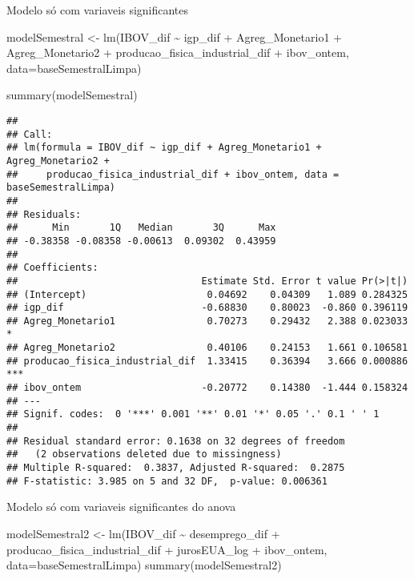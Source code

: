 \documentclass[
]{article}
\newenvironment{Shaded}{\begin{snugshade}}{\end{snugshade}}
\newcommand{\AttributeTok}[1]{\textcolor[rgb]{0.77,0.63,0.00}{#1}}
\newcommand{\FunctionTok}[1]{\textcolor[rgb]{0.00,0.00,0.00}{#1}}
\newcommand{\NormalTok}[1]{#1}
\newcommand{\OtherTok}[1]{\textcolor[rgb]{0.56,0.35,0.01}{#1}}
\newcommand{\SpecialCharTok}[1]{\textcolor[rgb]{0.00,0.00,0.00}{#1}}
\begin{document}
Modelo só com variaveis significantes

\begin{Shaded}
\begin{Highlighting}[]
\NormalTok{modelSemestral }\OtherTok{\textless{}{-}} \FunctionTok{lm}\NormalTok{(IBOV\_dif }\SpecialCharTok{\textasciitilde{}}\NormalTok{ igp\_dif }\SpecialCharTok{+}\NormalTok{ Agreg\_Monetario1 }\SpecialCharTok{+}\NormalTok{ Agreg\_Monetario2 }\SpecialCharTok{+}\NormalTok{ producao\_fisica\_industrial\_dif }\SpecialCharTok{+}\NormalTok{ ibov\_ontem,}
                     \AttributeTok{data=}\NormalTok{baseSemestralLimpa)}

\FunctionTok{summary}\NormalTok{(modelSemestral)}
\end{Highlighting}
\end{Shaded}

\begin{verbatim}
## 
## Call:
## lm(formula = IBOV_dif ~ igp_dif + Agreg_Monetario1 + Agreg_Monetario2 + 
##     producao_fisica_industrial_dif + ibov_ontem, data = baseSemestralLimpa)
## 
## Residuals:
##      Min       1Q   Median       3Q      Max 
## -0.38358 -0.08358 -0.00613  0.09302  0.43959 
## 
## Coefficients:
##                                Estimate Std. Error t value Pr(>|t|)    
## (Intercept)                     0.04692    0.04309   1.089 0.284325    
## igp_dif                        -0.68830    0.80023  -0.860 0.396119    
## Agreg_Monetario1                0.70273    0.29432   2.388 0.023033 *  
## Agreg_Monetario2                0.40106    0.24153   1.661 0.106581    
## producao_fisica_industrial_dif  1.33415    0.36394   3.666 0.000886 ***
## ibov_ontem                     -0.20772    0.14380  -1.444 0.158324    
## ---
## Signif. codes:  0 '***' 0.001 '**' 0.01 '*' 0.05 '.' 0.1 ' ' 1
## 
## Residual standard error: 0.1638 on 32 degrees of freedom
##   (2 observations deleted due to missingness)
## Multiple R-squared:  0.3837, Adjusted R-squared:  0.2875 
## F-statistic: 3.985 on 5 and 32 DF,  p-value: 0.006361
\end{verbatim}

Modelo só com variaveis significantes do anova

\begin{Shaded}
\begin{Highlighting}[]
\NormalTok{modelSemestral2 }\OtherTok{\textless{}{-}} \FunctionTok{lm}\NormalTok{(IBOV\_dif }\SpecialCharTok{\textasciitilde{}}\NormalTok{ desemprego\_dif }\SpecialCharTok{+}\NormalTok{ producao\_fisica\_industrial\_dif }\SpecialCharTok{+}\NormalTok{ jurosEUA\_log }\SpecialCharTok{+}\NormalTok{ ibov\_ontem,}
                     \AttributeTok{data=}\NormalTok{baseSemestralLimpa)}
\FunctionTok{summary}\NormalTok{(modelSemestral2)}
\end{Highlighting}
\end{Shaded}
\end{document}
